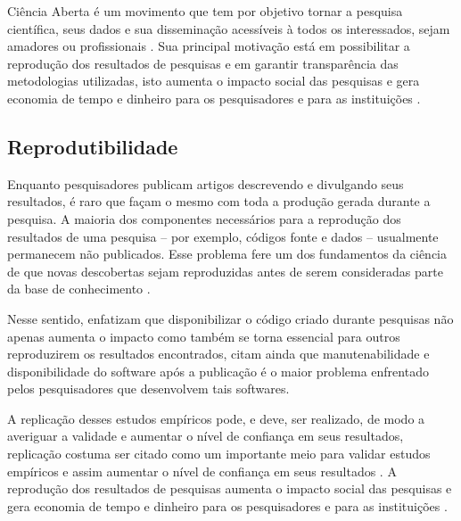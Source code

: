Ciência Aberta é um movimento que tem por objetivo tornar a pesquisa
científica, seus dados e sua disseminação acessíveis à todos os interessados,
sejam amadores ou profissionais \cite{WikipediaOpenScience}. Sua principal
motivação está em possibilitar a reprodução dos resultados de pesquisas e em
garantir transparência das metodologias utilizadas, isto aumenta o impacto
social das pesquisas e gera economia de tempo e dinheiro para os pesquisadores
e para as instituições \cite{nesta2010open}.


\subsection{Reprodutibilidade}

Enquanto pesquisadores publicam artigos descrevendo e divulgando seus
resultados, é raro que façam o mesmo com toda a produção gerada durante a
pesquisa. A maioria dos componentes necessários para a reprodução dos
resultados de uma pesquisa -- por exemplo, códigos fonte e dados -- usualmente
permanecem não publicados. Esse problema fere um dos fundamentos
da ciência de que novas descobertas sejam reproduzidas antes de serem
consideradas parte da base de conhecimento \cite{stodden2009enabling}.

Nesse sentido,  enfatizam que disponibilizar o código
criado durante pesquisas não apenas aumenta o impacto como também se torna
essencial para outros reproduzirem os resultados encontrados, citam ainda que
manutenabilidade e disponibilidade do software após a publicação é o maior
problema enfrentado pelos pesquisadores que desenvolvem tais softwares.

A replicação desses estudos empíricos pode, e deve, ser realizado, de modo a
averiguar a validade e aumentar o nível de confiança em seus resultados,
replicação costuma ser citado como um importante meio para validar estudos
empíricos e assim aumentar o nível de confiança em seus resultados
\cite{almqvist_replication_2006}. A reprodução dos resultados de pesquisas aumenta o impacto
social das pesquisas e gera economia de tempo e dinheiro para os pesquisadores
e para as instituições \cite{nesta2010open}.

